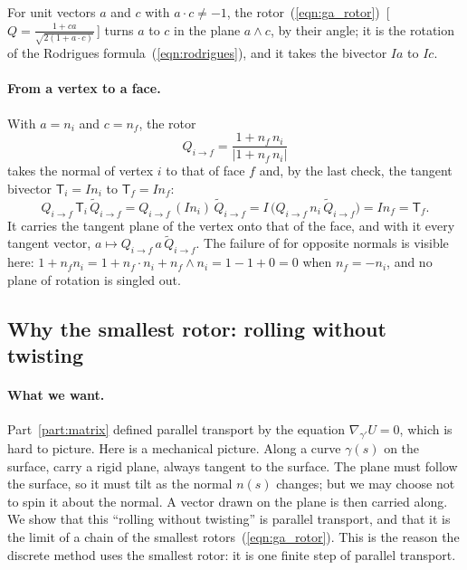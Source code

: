 \begin{prop}
\label{prop:ga_rotor}
For unit vectors $a$ and $c$ with $a\cdot c\ne -1$, the rotor~(\ref{eqn:ga_rotor})~[\,$Q = \frac{1 + ca}{\sqrt{2(1 + a\cdot c)}}$\,] turns $a$ to $c$ in the plane $a\wedge c$, by their angle; it is the rotation of the Rodrigues formula~(\ref{eqn:rodrigues}), and it takes the bivector $Ia$ to $Ic$.
\end{prop}

\paragraph{From a vertex to a face.} With $a = n_i$ and $c = n_f$, the rotor
\begin{equation}
\label{eqn:ga_Q}
Q_{i \to f} = \frac{1 + n_f\, n_i}{|1 + n_f\, n_i|}
\end{equation}
takes the normal of vertex $i$ to that of face $f$ and, by the last check, the tangent bivector $\mathsf T_i = I n_i$ to $\mathsf T_f = I n_f$:
\begin{equation*}
Q_{i\to f}\,\mathsf T_i\,\widetilde Q_{i\to f} = Q_{i\to f}\,(I n_i)\,\widetilde Q_{i\to f} = I\,\big(Q_{i\to f}\, n_i\,\widetilde Q_{i\to f}\big) = I n_f = \mathsf T_f .
\end{equation*}
It carries the tangent plane of the vertex onto that of the face, and with it every tangent vector, $a \mapsto Q_{i \to f}\, a\, \widetilde Q_{i \to f}$. The failure of  for opposite normals is visible here: $1 + n_f n_i = 1 + n_f\cdot n_i + n_f\wedge n_i = 1 - 1 + 0 = 0$ when $n_f = -n_i$, and no plane of rotation is singled out.

\subsection{Why the smallest rotor: rolling without twisting}

\paragraph{What we want.} Part~\ref{part:matrix} defined parallel transport by the equation $\nabla_{\gamma'} U = 0$, which is hard to picture. Here is a mechanical picture. Along a curve $\gamma(s)$ on the surface, carry a rigid plane, always tangent to the surface. The plane must follow the surface, so it must tilt as the normal $n(s)$ changes; but we may choose not to spin it about the normal. A vector drawn on the plane is then carried along. We show that this ``rolling without twisting'' is parallel transport, and that it is the limit of a chain of the smallest rotors~(\ref{eqn:ga_rotor}). This is the reason the discrete method uses the smallest rotor: it is one finite step of parallel transport.

